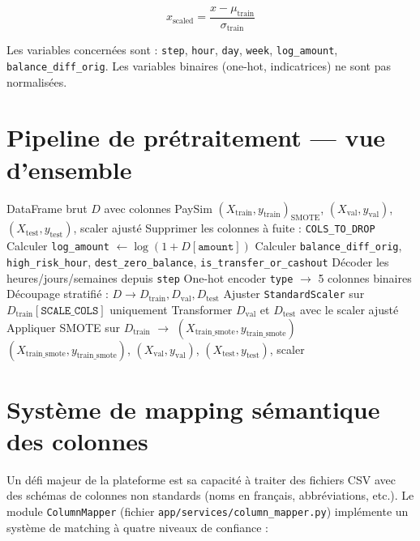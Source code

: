 \documentclass[12pt,a4paper,twoside]{report}
\theoremstyle{definition}
\begin{document}
\begin{equation}
x_{\text{scaled}} = \frac{x - \mu_{\text{train}}}{\sigma_{\text{train}}}
\label{eq:standardscaler}
\end{equation}

Les variables concernées sont : \texttt{step}, \texttt{hour}, \texttt{day},
\texttt{week}, \texttt{log\_amount}, \texttt{balance\_diff\_orig}.
Les variables binaires (one-hot, indicatrices) ne sont pas normalisées.

\section{Pipeline de prétraitement — vue d'ensemble}

\begin{algorithm}[H]
\caption{Pipeline de prétraitement complet}
\label{algo:preprocessing}
\begin{algorithmic}[1]
\Require DataFrame brut $D$ avec colonnes PaySim
\Ensure $(X_{\text{train}}, y_{\text{train}})_{\text{SMOTE}}$,
        $(X_{\text{val}}, y_{\text{val}})$,
        $(X_{\text{test}}, y_{\text{test}})$,
        scaler ajusté
\State Supprimer les colonnes à fuite : \texttt{COLS\_TO\_DROP}
\State Calculer \texttt{log\_amount} $\leftarrow \log(1 + D[\texttt{amount}])$
\State Calculer \texttt{balance\_diff\_orig}, \texttt{high\_risk\_hour},
       \texttt{dest\_zero\_balance}, \texttt{is\_transfer\_or\_cashout}
\State Décoder les heures/jours/semaines depuis \texttt{step}
\State One-hot encoder \texttt{type} $\rightarrow$ 5 colonnes binaires
\State Découpage stratifié : $D \rightarrow D_{\text{train}}, D_{\text{val}}, D_{\text{test}}$
\State Ajuster \texttt{StandardScaler} sur $D_{\text{train}}[\texttt{SCALE\_COLS}]$ uniquement
\State Transformer $D_{\text{val}}$ et $D_{\text{test}}$ avec le scaler ajusté
\State Appliquer SMOTE sur $D_{\text{train}}$ $\rightarrow$ $(X_{\text{train\_smote}}, y_{\text{train\_smote}})$
\State \Return $(X_{\text{train\_smote}}, y_{\text{train\_smote}})$, $(X_{\text{val}}, y_{\text{val}})$,
        $(X_{\text{test}}, y_{\text{test}})$, scaler
\end{algorithmic}
\end{algorithm}

\section{Système de mapping sémantique des colonnes}

Un défi majeur de la plateforme est sa capacité à traiter des fichiers CSV avec
des schémas de colonnes non standards (noms en français, abbréviations, etc.).
Le module \texttt{ColumnMapper} (fichier \texttt{app/services/column\_mapper.py})
implémente un système de matching à quatre niveaux de confiance :
\end{document}
